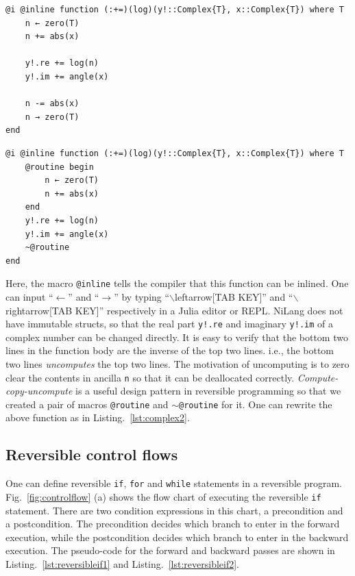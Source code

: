 \documentclass{article}
\let\oldsim\sim
\renewcommand{\sim}{{\oldsim}}
\newcommand{\<}{\langle}
\renewcommand{\>}{\rangle}
\newcommand{\Fig}[1]{Fig.~\ref{#1}}
\newcommand{\Lst}[1]{Listing.~\ref{#1}}
\theoremstyle{definition}\newtheorem{definition}{\textit{Definition}}
\begin{document}
\begin{minipage}{.45\columnwidth}
\begin{lstlisting}[mathescape=true,caption={Reversible complex valued log function $y\mathrel{+}=\log(|x|) + i{\rm Arg}(x)$.},label={lst:complex}]
@i @inline function (:+=)(log)(y!::Complex{T}, x::Complex{T}) where T
    n ← zero(T)
    n += abs(x)

    y!.re += log(n)
    y!.im += angle(x)

    n -= abs(x)
    n → zero(T)
end
\end{lstlisting}
\end{minipage}\hfill
\begin{minipage}{.45\columnwidth}
    \begin{lstlisting}[mathescape=true,caption={Compute-copy-uncompute version of \Lst{lst:complex}},label={lst:complex2}]
@i @inline function (:+=)(log)(y!::Complex{T}, x::Complex{T}) where T
    @routine begin
        n ← zero(T)
        n += abs(x)
    end
    y!.re += log(n)
    y!.im += angle(x)
    ~@routine
end
\end{lstlisting}
\end{minipage}

Here, the macro \texttt{@inline} tells the compiler that this function can be inlined. One can input ``$\leftarrow$'' and ``$\rightarrow$'' by typing ``$\backslash$leftarrow[TAB KEY]'' and ``$\backslash$rightarrow[TAB KEY]'' respectively in a Julia editor or REPL.
NiLang does not have immutable structs, so that the real part \texttt{y!.re} and imaginary \texttt{y!.im} of a complex number can be changed directly.
It is easy to verify that the bottom two lines in the function body are the inverse of the top two lines. i.e., the bottom two lines \textit{uncomputes} the top two lines.
The motivation of uncomputing is to zero clear the contents in ancilla \texttt{n} so that it can be deallocated correctly.
\textit{Compute-copy-uncompute} is a useful design pattern in reversible programming so that we created a pair of macros \texttt{@routine} and \texttt{$\sim$@routine} for it. One can rewrite the above function as in \Lst{lst:complex2}.

\subsection{Reversible control flows}
One can define reversible \texttt{if}, \texttt{for} and \texttt{while} statements in a reversible program.
\Fig{fig:controlflow} (a) shows the flow chart of executing the reversible \texttt{if} statement. There are two condition expressions in this chart, a precondition and a postcondition. The precondition decides which branch to enter in the forward execution, while the postcondition decides which branch to enter in the backward execution. The pseudo-code for the forward and backward passes are shown in \Lst{lst:reversibleif1} and \Lst{lst:reversibleif2}.
\end{document}
